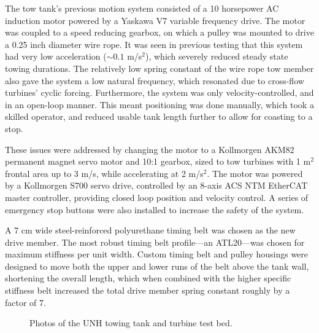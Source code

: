 The tow tank's previous motion system consisted of a 10 horsepower AC induction
motor powered by a Yaskawa V7 variable frequency drive. The motor was coupled to
a speed reducing gearbox, on which a pulley was mounted to drive a 0.25 inch
diameter wire rope. It was seen in previous testing that this system had very
low acceleration ($\sim 0.1$ m/s$^2$), which severely reduced steady state
towing durations. The relatively low spring constant of the wire rope tow member
also gave the system a low natural frequency, which resonated due to cross-flow
turbines' cyclic forcing. Furthermore, the system was only velocity-controlled,
and in an open-loop manner. This meant positioning was done manually, which took
a skilled operator, and reduced usable tank length further to allow for coasting
to a stop.

These issues were addressed by changing the motor to a Kollmorgen AKM82
permanent magnet servo motor and 10:1 gearbox, sized to tow turbines with 1
m$^2$ frontal area up to 3 m/s, while accelerating at 2 m/s$^2$. The motor was
powered by a Kollmorgen S700 servo drive, controlled by an 8-axis ACS NTM
EtherCAT master controller, providing closed loop position and velocity control.
A series of emergency stop buttons were also installed to increase the safety of
the system.

A 7 cm wide steel-reinforced polyurethane timing belt was chosen as the new
drive member. The most robust timing belt profile---an ATL20---was chosen for
maximum stiffness per unit width. Custom timing belt and pulley housings were
designed to move both the upper and lower runs of the belt above the tank wall,
shortening the overall length, which when combined with the higher specific
stiffness belt increased the total drive member spring constant roughly by a
factor of 7.




\begin{figure}[ht!]
    \centering 
    \caption{Photos of the UNH towing tank and turbine test bed.} 
    \label{fig:tow-tank}
\end{figure}


